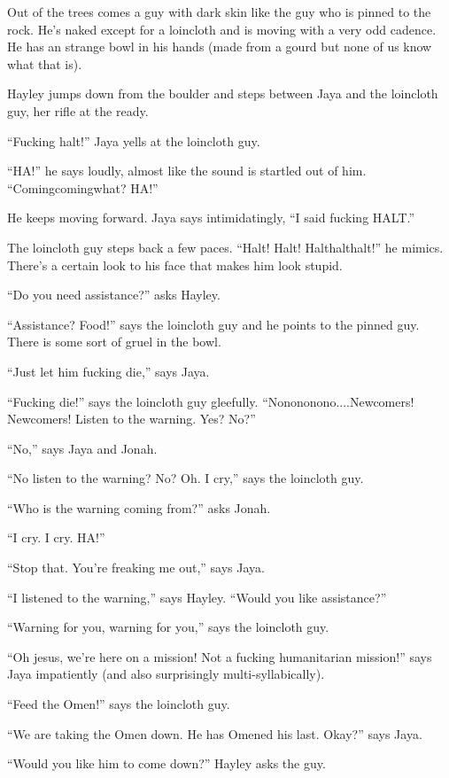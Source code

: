 Out of the trees comes a guy with dark skin like the guy who is pinned to the rock.  He's naked except for a loincloth and is moving with a very odd cadence.  He has an strange bowl in his hands (made from a gourd but none of us know what that is).

Hayley jumps down from the boulder and steps between Jaya and the loincloth guy, her rifle at the ready.

``Fucking halt!'' Jaya yells at the loincloth guy.

``HA!'' he says loudly, almost like the sound is startled out of him.  ``Comingcomingwhat?  HA!''

He keeps moving forward.  Jaya says intimidatingly, ``I said fucking HALT.''

The loincloth guy steps back a few paces.  ``Halt!  Halt!  Halthalthalt!'' he mimics.  There's a certain look to his face that makes him look stupid.

``Do you need assistance?'' asks Hayley.

``Assistance?  Food!'' says the loincloth guy and he points to the pinned guy.  There is some sort of gruel in the bowl.

``Just let him fucking die,'' says Jaya.

``Fucking die!'' says the loincloth guy gleefully.  ``Nonononono....Newcomers!  Newcomers!  Listen to the warning.  Yes?  No?''

``No,'' says Jaya and Jonah.

``No listen to the warning?  No?  Oh.  I cry,'' says the loincloth guy.

``Who is the warning coming from?'' asks Jonah.

``I cry.  I cry.  HA!''

``Stop that.  You're freaking me out,'' says Jaya.

``I listened to the warning,'' says Hayley. ``Would you like assistance?''

``Warning for you, warning for you,'' says the loincloth guy.

``Oh jesus, we're here on a mission!  Not a fucking humanitarian mission!'' says Jaya impatiently (and also surprisingly multi-syllabically).

``Feed the Omen!'' says the loincloth guy.

``We are taking the Omen down.  He has Omened his last. Okay?'' says Jaya.

``Would you like him to come down?'' Hayley asks the guy.

